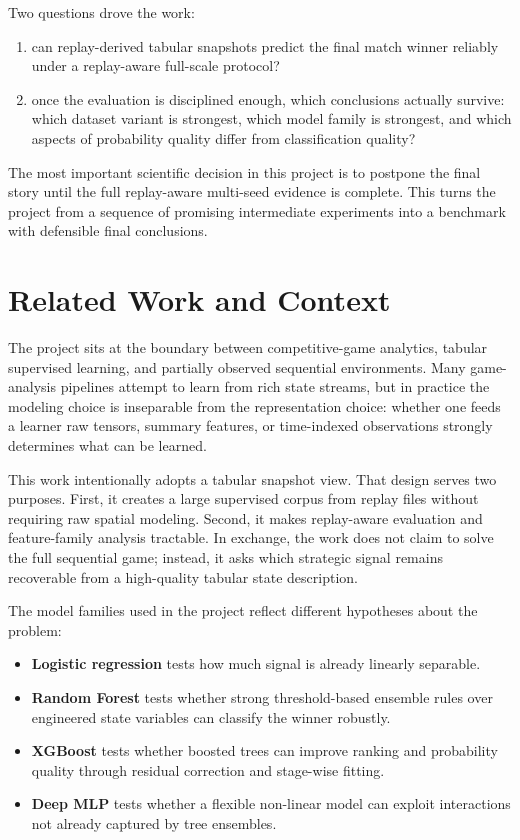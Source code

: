 \documentclass[11pt,a4paper]{article}
\begin{document}
Two questions drove the work:
\begin{enumerate}
    \item can replay-derived tabular snapshots predict the final match winner reliably under a replay-aware full-scale protocol?
    \item once the evaluation is disciplined enough, which conclusions actually survive: which dataset variant is strongest, which model family is strongest, and which aspects of probability quality differ from classification quality?
\end{enumerate}

\begin{keybox}
The most important scientific decision in this project is to postpone the final story until the full replay-aware multi-seed evidence is complete. This turns the project from a sequence of promising intermediate experiments into a benchmark with defensible final conclusions.
\end{keybox}

\section{Related Work and Context}
The project sits at the boundary between competitive-game analytics, tabular supervised learning, and partially observed sequential environments. Many game-analysis pipelines attempt to learn from rich state streams, but in practice the modeling choice is inseparable from the representation choice: whether one feeds a learner raw tensors, summary features, or time-indexed observations strongly determines what can be learned.

This work intentionally adopts a tabular snapshot view. That design serves two purposes. First, it creates a large supervised corpus from replay files without requiring raw spatial modeling. Second, it makes replay-aware evaluation and feature-family analysis tractable. In exchange, the work does not claim to solve the full sequential game; instead, it asks which strategic signal remains recoverable from a high-quality tabular state description.

The model families used in the project reflect different hypotheses about the problem:
\begin{itemize}
    \item \textbf{Logistic regression} tests how much signal is already linearly separable.
    \item \textbf{Random Forest} tests whether strong threshold-based ensemble rules over engineered state variables can classify the winner robustly.
    \item \textbf{XGBoost} tests whether boosted trees can improve ranking and probability quality through residual correction and stage-wise fitting.
    \item \textbf{Deep MLP} tests whether a flexible non-linear model can exploit interactions not already captured by tree ensembles.
\end{itemize}
\end{document}
